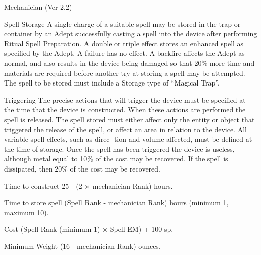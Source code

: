 \begin{Chapter}{Mechanician (Ver 2.2)}
\begin{Description}
\item[Spell] Storage A single charge of a suitable spell may be stored
  in the trap or container by an Adept successfully casting a spell
  into the device after performing Ritual Spell Preparation.  A double
  or triple effect stores an enhanced spell as specified by the Adept.
  A failure has no effect.  A backfire affects the Adept as normal,
  and also results in the device being damaged so that 20\% more time
  and materials are required before another try at storing a spell may
  be attempted.  The spell to be stored must include a Storage type of
  “Magical Trap”.

\item[Triggering] The precise actions that will trigger the device
  must be specified at the time that the device is constructed.  When
  these actions are performed the spell is released.  The spell stored
  must either affect only the entity or object that triggered the
  release of the spell, or affect an area in relation to the
  device. All variable spell effects, such as direc- tion and volume
  affected, must be defined at the time of storage.  Once the spell
  has been triggered the device is useless, although metal equal to
  10\% of the cost may be recovered.  If the spell is dissipated,
  then 20\% of the cost may be recovered.

\item[Time to construct] 25 - (2 × mechanician Rank) hours.

\item[Time to store spell] (Spell Rank - mechanician Rank) hours
  (minimum 1, maximum 10).

\item[Cost] (Spell Rank (minimum 1) × Spell EM) + 100 sp.

\item[Minimum Weight] (16 - mechanician Rank) ounces.

\end{Description}
  
\end{Chapter}
